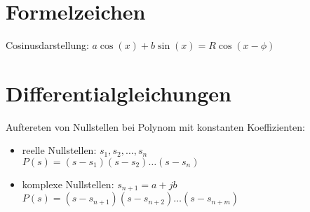 \documentclass[german]{latex4ei/latex4ei_sheet}
\begin{document}
\section{Formelzeichen}

Cosinusdarstellung:
    $a \cos(x) + b \sin(x) = R \cos(x - \phi)$

\section{Differentialgleichungen}
  


Auftereten von Nullstellen bei Polynom mit konstanten Koeffizienten:
\begin{itemize}
    \item reelle Nullstellen: $s_1, s_2, \ldots, s_n$ \\
    $P(s) = (s - s_1)(s - s_2) \ldots (s - s_n)$
    \item komplexe Nullstellen: $s_{n+1} = a + jb$ \\
    $P(s) = (s - s_{n+1})(s - s_{n+2}) \ldots (s - s_{n+m})$
\end{itemize}
\end{document}
